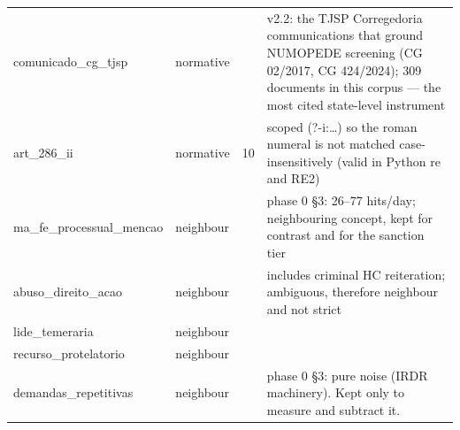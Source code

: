 \begin{table}[htbp]
\begin{tabular}{llll}
comunicado\_cg\_tjsp & normative &  & v2.2: the TJSP Corregedoria communications that ground NUMOPEDE screening (CG 02/2017, CG 424/2024); 309 documents in this corpus — the most cited state-level instrument \\
art\_286\_ii & normative & 10 & scoped (?-i:…) so the roman numeral is not matched case-insensitively (valid in Python re and RE2) \\
ma\_fe\_processual\_mencao & neighbour &  & phase 0 §3: 26–77 hits/day; neighbouring concept, kept for contrast and for the sanction tier \\
abuso\_direito\_acao & neighbour &  & includes criminal HC reiteration; ambiguous, therefore neighbour and not strict \\
lide\_temeraria & neighbour &  &  \\
recurso\_protelatorio & neighbour &  &  \\
demandas\_repetitivas & neighbour &  & phase 0 §3: pure noise (IRDR machinery). Kept only to measure and subtract it. \\
\bottomrule
\end{tabular}
\end{table}
